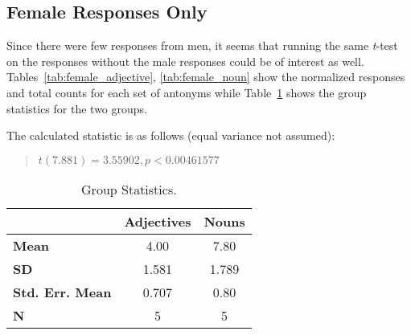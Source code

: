 \subsection{Female Responses Only}
Since there were few responses from men, it seems that running the same \textit{t}-test on the responses without the male responses could be of interest as well.  Tables~\ref{tab:female_adjective}, \ref{tab:female_noun} show the normalized responses and total counts for each set of antonyms while Table~\ref{tab:female_group_stats} shows the group statistics for the two groups.





The calculated statistic is as follows (equal variance not assumed):
	\begin{quote}
		$t(7.881)=3.55902, p < 0.00461577$ 
	\end{quote}


\begin{table}
	\begin{center}
		\begin{tabular}{|l|c|c|} \hline
									& \textbf{Adjectives} 	& \textbf{Nouns}  \\ \hline \hline
			\textbf{Mean} 			& 4.00					& 7.80	\\
			\textbf{SD} 			& 1.581					& 1.789	\\
			\textbf{Std. Err. Mean} & 0.707					& 0.80	\\
			\textbf{N} 				& 5						& 5		\\
			\hline
		\end{tabular}
	\end{center}
	\caption {Group Statistics.}
	\label{tab:female_group_stats}
\end{table}




%
